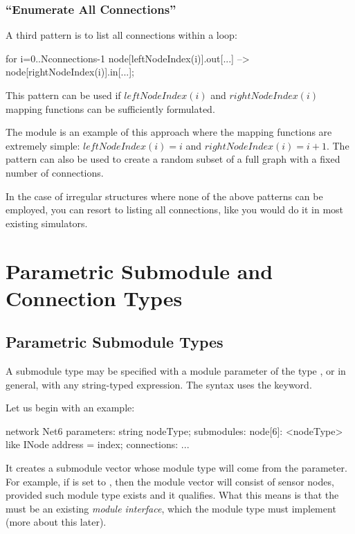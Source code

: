 \subsubsection{``Enumerate All Connections''}
\label{sec:ned-lang:enumerate-all-connections}


A third pattern is to list all connections within a loop:

\begin{ned}
for i=0..Nconnections-1 {
    node[leftNodeIndex(i)].out[...] --> node[rightNodeIndex(i)].in[...];
}
\end{ned}

This pattern can be used if $leftNodeIndex(i)$ and $rightNodeIndex(i)$
mapping functions can be sufficiently formulated.

The  module is an example of this approach where the mapping
functions are extremely simple: $leftNodeIndex(i)=i$ and $rightNodeIndex(i) = i+1$.
The pattern can also be used to create a random subset of a full
graph with a fixed number of connections.

In the case of irregular structures where none of the above patterns
can be employed, you can resort to listing all connections, like you
would do it in most existing simulators.



\section{Parametric Submodule and Connection Types}
\label{sec:ned-lang:parametric-submodule-and-connection-types}

\subsection{Parametric Submodule Types}
\label{sec:ned-lang:submodule-like}

A submodule type may be specified with a module parameter of the type
, or in general, with any string-typed expression.
The syntax uses the  keyword.

Let us begin with an example:

\begin{ned}
network Net6
{
    parameters:
        string nodeType;
    submodules:
        node[6]: <nodeType> like INode {
            address = index;
        }
    connections:
        ...
}
\end{ned}

It creates a submodule vector whose module type will come from the
 parameter. For example, if  is set to ,
then the module vector will consist of sensor nodes, provided such module
type exists and it qualifies. What this means is that the  must be
an existing \textit{module interface}, which the 
module type must implement (more about this later).

